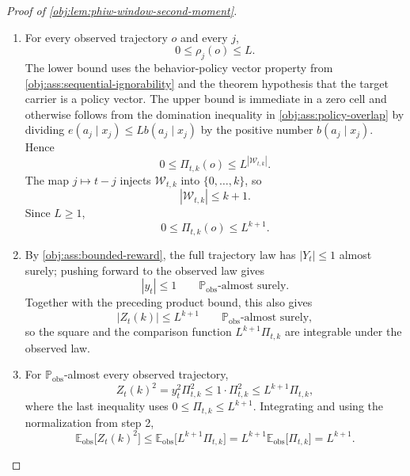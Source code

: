 \begin{proof}[Proof of \cref{obj:lem:phiw-window-second-moment}]
\begin{enumerate}
\item
For every observed trajectory \(o\) and every \(j\),
\[
0\le \rho_j(o)\le L.
\]
The lower bound uses the behavior-policy vector property from \cref{obj:ass:sequential-ignorability} and the theorem hypothesis that the target carrier is a policy vector. The upper bound is immediate in a zero cell and otherwise follows from the domination inequality in \cref{obj:ass:policy-overlap} by dividing \(e(a_j\mid x_j)\le Lb(a_j\mid x_j)\) by the positive number \(b(a_j\mid x_j)\). Hence
\[
0\le \Pi_{t,k}(o)\le L^{|\mathcal W_{t,k}|}.
\]
The map \(j\mapsto t-j\) injects \(\mathcal W_{t,k}\) into \(\{0,\ldots,k\}\), so
\[
|\mathcal W_{t,k}|\le k+1.
\]
Since \(L\ge 1\),
\[
0\le \Pi_{t,k}(o)\le L^{k+1}.
\]

\item
By \cref{obj:ass:bounded-reward}, the full trajectory law has \(|Y_t|\le 1\) almost surely; pushing forward to the observed law gives
\[
|y_t|\le 1
\qquad \mathbb P_{\mathrm{obs}}\text{-almost surely}.
\]
Together with the preceding product bound, this also gives
\[
|Z_t(k)|\le L^{k+1}
\qquad \mathbb P_{\mathrm{obs}}\text{-almost surely},
\]
so the square and the comparison function \(L^{k+1}\Pi_{t,k}\) are integrable under the observed law.

\item
For \(\mathbb P_{\mathrm{obs}}\)-almost every observed trajectory,
\[
Z_t(k)^2
=
y_t^2\Pi_{t,k}^2
\le
1\cdot \Pi_{t,k}^2
\le
L^{k+1}\Pi_{t,k},
\]
where the last inequality uses \(0\le \Pi_{t,k}\le L^{k+1}\). Integrating and using the normalization from step 2,
\[
\mathbb E_{\mathrm{obs}}\bigl[Z_t(k)^2\bigr]
\le
\mathbb E_{\mathrm{obs}}\bigl[L^{k+1}\Pi_{t,k}\bigr]
=
L^{k+1}\mathbb E_{\mathrm{obs}}\bigl[\Pi_{t,k}\bigr]
=
L^{k+1}.
\]
\end{enumerate}
\end{proof}
